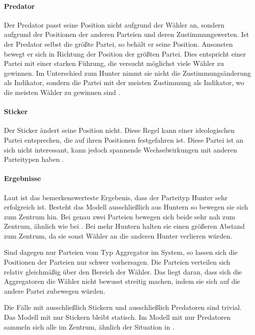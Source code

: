 \paragraph{Predator} Der Predator passt seine Position nicht aufgrund der Wähler an, sondern aufgrund der Positionen der anderen Parteien und deren Zustimmungswerten. Ist der Predator selbst die größte Partei, so behält er seine Position. Ansonsten bewegt er sich in Richtung der Position der größten Partei. Dies entspricht einer Partei mit einer starken Führung, die versucht möglichst viele Wähler zu gewinnen. Im Unterschied zum Hunter nimmt sie nicht die Zustimmungsänderung als Indikator, sondern die Partei mit der meisten Zustimmung als Indikator, wo die meisten Wähler zu gewinnen sind \citep[S.\,267]{laver2005policy}.

\paragraph{Sticker} Der Sticker ändert seine Position nicht. Diese Regel kann einer ideologischen Partei entsprechen, die auf ihren Positionen festgefahren ist. Diese Partei ist an sich nicht interessant, kann jedoch spannende Wechselwirkungen mit anderen Parteitypen haben \citep[S.\,267]{laver2005policy}.

\paragraph{Ergebnisse}
Laut \citet{laver2005policy} ist das bemerkenswerteste Ergebenis, dass der Parteityp Hunter sehr erfolgreich ist. Besteht das Modell ausschließlich aus Huntern so bewegen sie sich zum Zentrum hin. Bei genau zwei Parteien bewegen sich beide sehr nah zum Zentrum, ähnlich wie bei \citet{hotelling1929}. Bei mehr Huntern halten sie einen größeren Abstand zum Zentrum, da sie sonst Wähler an die anderen Hunter verlieren würden. \citep[S.\,267-70]{laver2005policy}

Sind dagegen nur Parteien vom Typ Aggregator im System, so lassen sich die Positionen der Parteien nur schwer vorhersagen. Die Parteien verteilen sich relativ gleichmäßig über den Bereich der Wähler. Das liegt daran, dass sich die Aggregatoren die Wähler nicht bewusst streitig machen, indem sie sich auf die andere Partei zubewegen würden. \citep[S.\,270-1]{laver2005policy}

Die Fälle mit ausschließlich Stickern und ausschließlich Predatoren sind trivial. Das Modell mit nur Stickern bleibt statisch. Im Modell mit nur Predatoren sammeln sich alle im Zentrum, ähnlich der Situation in \citet{hotelling1929}.

